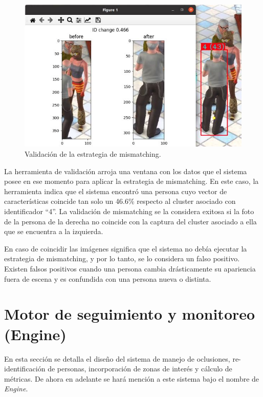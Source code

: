 \begin{figure}[ht]
	\centering
	\includegraphics[scale=.7]{./Figures/validarMismatching.jpg}
	\caption{Validación de la estrategia de mismatching.}
	\label{fig:validarMismatching}
\end{figure}

La herramienta de validación arroja una ventana con los datos que el sistema posee en ese momento para aplicar la estrategia de mismatching. En este caso, la herramienta indica que el sistema encontró una persona cuyo vector de características coincide tan solo un 46.6\% respecto al cluster asociado con identificador ``4''. La validación de mismatching se la considera exitosa si la foto de la persona de la derecha no coincide con la captura del cluster asociado a ella que se encuentra a la izquierda.

En caso de coincidir las imágenes significa que el sistema no debía ejecutar la estrategia de mismatching, y por lo tanto, se lo considera un falso positivo. Existen falsos positivos cuando una persona cambia drásticamente su apariencia fuera de escena y es confundida con una persona nueva o distinta.

\newpage


\section{Motor de seguimiento y monitoreo (Engine)}
\label{sec:engine}

En esta sección se detalla el diseño del sistema de manejo de oclusiones, re-identificación de personas, incorporación de zonas de interés y cálculo de métricas. De ahora en adelante se hará mención a este sistema bajo el nombre de \textit{Engine}.

